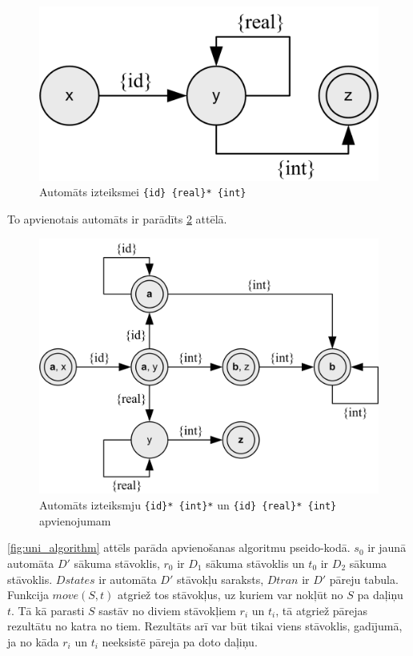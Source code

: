 \begin{figure}[H]
  \centering
    \includegraphics[scale=1.5]{pictures/auto_m_2}
  \caption{\label{fig:auto_m_2}Automāts izteiksmei \texttt{\{id\} \{real\}* \{int\}}}
\end{figure}

To apvienotais automāts ir parādīts \ref{fig:auto_merge} attēlā.

\begin{figure}[H]
  \centering
    \includegraphics[scale=1.5]{pictures/auto_merge}
  \caption{\label{fig:auto_merge}Automāts izteiksmju \texttt{\{id\}* \{int\}*} un \texttt{\{id\} \{real\}* \{int\}} apvienojumam}
\end{figure}

\ref{fig:uni_algorithm} attēls parāda apvienošanas algoritmu pseido-kodā. $s_0$ ir jaunā automāta $D'$ sākuma stāvoklis, $r_0$ ir $D_1$ sākuma stāvoklis un $t_0$ ir $D_2$ sākuma stāvoklis. $Dstates$ ir automāta $D'$ stāvokļu saraksts, $Dtran$ ir $D'$ pāreju tabula. Funkcija $move (S, t)$ atgriež tos stāvokļus, uz kuriem var nokļūt no $S$ pa daļiņu $t$. Tā kā parasti $S$ sastāv no diviem stāvokļiem $r_i$ un $t_i$, tā atgriež pārejas rezultātu no katra no tiem. Rezultāts arī var būt tikai viens stāvoklis, gadījumā, ja no kāda $r_i$ un $t_i$ neeksistē pāreja pa doto daļiņu.

